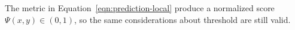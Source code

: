 



The metric in Equation~\ref{eqn:prediction-local} produce a normalized score $\Psi(x,y) \in (0,1)$, so the same considerations about  threshold are still valid. 